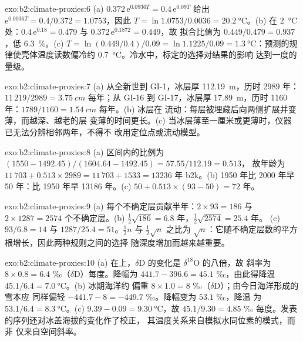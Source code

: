 \begin{solution}{exo:b2:climate-proxies:6}
(a) $0.372\,\mathrm{e}^{0.0936T} = 0.4\,\mathrm{e}^{0.09T}$ 给出 $\mathrm{e}^{0.0036T} =
0.4/0.372 = 1.0753$，因此 $T = \ln 1.0753/0.0036 = \qty{20.2}{\celsius}$。(b) 在
\qty{2}{\celsius} 处：$0.4\,\mathrm{e}^{0.18} = 0.479$ 与 $0.372\,\mathrm{e}^{0.1872} = 0.449$，故
拟合比值为 $0.449/0.479 = 0.937$，低 \qty{6.3}{\percent}。(c) $T = \ln(0.449/0.4)/0.09 =
\ln 1.1225/0.09 = \qty{1.3}{\celsius}$：预测的规律使壳体温度读数偏冷约
\qty{0.7}{\celsius}。冷水中，标定的选择对结果的影响
达到一度的量级。
\end{solution}

\begin{solution}{exo:b2:climate-proxies:7}
(a) 从全新世到 GI-1，冰层厚 \qty{112.19}{m}，历时 2989 年：$11\,219/2989 =
\qty{3.75}{cm}$ 每年；从 GI-16 到 GI-17，冰层厚 \qty{17.89}{m}，历时 1160 年：$1789/1160 =
\qty{1.54}{cm}$ 每年。(b) 冰层在
流动：每层被埋藏后向两侧扩展并变薄，而越深、越老的层
变薄的时间更长。(c) 当冰层薄至一厘米或更薄时，仪器
已无法分辨相邻两年，不得不
改用定位点或流动模型。
\end{solution}

\begin{solution}{exo:b2:climate-proxies:8}
(a) 区间内的比例为 $(1550 - 1492.45)/(1604.64 - 1492.45) = 57.55/112.19 = 0.513$，
故年龄为 $11\,703 + 0.513 \times 2989 = 11\,703 + 1533 = \num{13236}$ 年 b2k。(b) 1950 年比 2000 年早
50 年：比 1950 年早 \num{13186} 年。(c) $50 + 0.513 \times (93 - 50) = 72$ 年。
\end{solution}

\begin{solution}{exo:b2:climate-proxies:9}
(a) 每个不确定层贡献半年：$2 \times 93 = 186$ 与 $2 \times 1287 = 2574$
个不确定层。(b) $\frac12\sqrt{186} = 6.8$ 年，$\frac12\sqrt{2574} = 25.4$ 年。
(c) $93/6.8 = 14$ 与 $1287/25.4 = 51$。$\frac12 n$ 与 $\frac12\sqrt{n}$ 之比为
$\sqrt{n}$：它随不确定层数的平方根增长，因此两种规则之间的选择
随深度增加而越来越重要。
\end{solution}

\begin{solution}{exo:b2:climate-proxies:10}
(a) 在上，$\delta$D 的变化是 $\delta^{18}$O 的八倍，故
斜率为 $8 \times 0.8 = 6.4$ ‰（$\delta$D）每度。降幅为 $441.7 - 396.6 = 45.1$
‰，由此得降温 $45.1/6.4 = \qty{7.0}{\celsius}$。(b) 冰期海洋约
偏重 $8 \times 1.0 = 8$ ‰（$\delta$D）；由今日海洋形成的雪本应
同样偏轻 $-441.7 - 8 = -449.7$ ‰。降幅变为 $53.1$ ‰，降温
为 $53.1/6.4 = \qty{8.3}{\celsius}$。(c) $9.39 - 0.09 = \qty{9.30}{\celsius}$，故 $45.1/9.30 = 4.85$
‰ 每度。发表的序列还对冰盖海拔的变化作了校正，
其温度关系来自模拟水同位素的模式，而非
仅来自空间斜率。
\end{solution}

